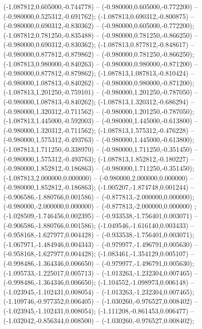  (-1.087812,0.605000,-0.744778) -- (-0.980000,0.605000,-0.772200) -- (-0.980000,0.525312,-0.691762);
 (-1.087813,0.690312,-0.800875) -- (-0.980000,0.690312,-0.830362) -- (-0.980000,0.605000,-0.772200);
 (-1.087812,0.781250,-0.835488) -- (-0.980000,0.781250,-0.866250) -- (-0.980000,0.690312,-0.830362);
 (-1.087813,0.877812,-0.848617) -- (-0.980000,0.877812,-0.879862) -- (-0.980000,0.781250,-0.866250);
 (-1.087813,0.980000,-0.840263) -- (-0.980000,0.980000,-0.871200) -- (-0.980000,0.877812,-0.879862);
 (-1.087813,1.087813,-0.810424) -- (-0.980000,1.087813,-0.840262) -- (-0.980000,0.980000,-0.871200);
 (-1.087813,1.201250,-0.759101) -- (-0.980000,1.201250,-0.787050) -- (-0.980000,1.087813,-0.840262);
 (-1.087813,1.320312,-0.686294) -- (-0.980000,1.320312,-0.711562) -- (-0.980000,1.201250,-0.787050);
 (-1.087813,1.445000,-0.592003) -- (-0.980000,1.445000,-0.613800) -- (-0.980000,1.320312,-0.711562);
 (-1.087813,1.575312,-0.476228) -- (-0.980000,1.575312,-0.493763) -- (-0.980000,1.445000,-0.613800);
 (-1.087813,1.711250,-0.338970) -- (-0.980000,1.711250,-0.351450) -- (-0.980000,1.575312,-0.493763);
 (-1.087813,1.852812,-0.180227) -- (-0.980000,1.852812,-0.186863) -- (-0.980000,1.711250,-0.351450);
 (-1.087813,2.000000,0.000000) -- (-0.980000,2.000000,0.000000) -- (-0.980000,1.852812,-0.186863);
 (-1.005207,-1.874748,0.001244) -- (-0.906586,-1.880766,0.001586) -- (-0.877813,-2.000000,0.000000);
 (-0.980000,-2.000000,0.000000) -- (-0.877813,-2.000000,0.000000) ;
 (-1.028509,-1.746456,0.002395) -- (-0.933538,-1.756401,0.003071) -- (-0.906586,-1.880766,0.001586);
 (-1.049546,-1.616140,0.003433) -- (-0.958168,-1.627977,0.004428) -- (-0.933538,-1.756401,0.003071);
 (-1.067971,-1.484946,0.004343) -- (-0.979977,-1.496791,0.005630) -- (-0.958168,-1.627977,0.004428);
 (-1.083461,-1.354129,0.005107) -- (-0.998486,-1.364346,0.006650) -- (-0.979977,-1.496791,0.005630);
 (-1.095733,-1.225017,0.005713) -- (-1.013263,-1.232304,0.007465) -- (-0.998486,-1.364346,0.006650);
 (-1.104552,-1.098973,0.006148) -- (-1.023945,-1.102431,0.008054) -- (-1.013263,-1.232304,0.007465);
 (-1.109746,-0.977352,0.006405) -- (-1.030260,-0.976527,0.008402) -- (-1.023945,-1.102431,0.008054);
 (-1.111208,-0.861453,0.006477) -- (-1.032042,-0.856344,0.008500) -- (-1.030260,-0.976527,0.008402);
